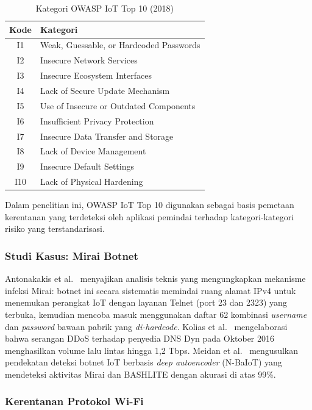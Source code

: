 \documentclass[conference]{IEEEtran}
\begin{document}
\begin{table}[htbp]
\caption{Kategori OWASP IoT Top 10 (2018)}
\label{tab:owasp_list}
\renewcommand{\arraystretch}{1.2}
\begin{tabularx}{\columnwidth}{|c|X|}
\hline
\textbf{Kode} & \textbf{Kategori} \\
\hline
I1 & Weak, Guessable, or Hardcoded Passwords \\
\hline
I2 & Insecure Network Services \\
\hline
I3 & Insecure Ecosystem Interfaces \\
\hline
I4 & Lack of Secure Update Mechanism \\
\hline
I5 & Use of Insecure or Outdated Components \\
\hline
I6 & Insufficient Privacy Protection \\
\hline
I7 & Insecure Data Transfer and Storage \\
\hline
I8 & Lack of Device Management \\
\hline
I9 & Insecure Default Settings \\
\hline
I10 & Lack of Physical Hardening \\
\hline
\end{tabularx}
\end{table}

Dalam penelitian ini, OWASP IoT Top 10 digunakan sebagai basis pemetaan kerentanan yang terdeteksi oleh aplikasi pemindai terhadap kategori-kategori risiko yang terstandarisasi.

\subsubsection{Studi Kasus: Mirai Botnet}

Antonakakis et al.\ \cite{antonakakis2017} menyajikan analisis teknis yang mengungkapkan mekanisme infeksi Mirai: botnet ini secara sistematis memindai ruang alamat IPv4 untuk menemukan perangkat IoT dengan layanan Telnet (port 23 dan 2323) yang terbuka, kemudian mencoba masuk menggunakan daftar 62 kombinasi \textit{username} dan \textit{password} bawaan pabrik yang \textit{di-hardcode}. Kolias et al.\ \cite{kolias2017} mengelaborasi bahwa serangan DDoS terhadap penyedia DNS Dyn pada Oktober 2016 menghasilkan volume lalu lintas hingga 1,2 Tbps. Meidan et al.\ \cite{meidan2018} mengusulkan pendekatan deteksi botnet IoT berbasis \textit{deep autoencoder} (N-BaIoT) yang mendeteksi aktivitas Mirai dan BASHLITE dengan akurasi di atas 99\%.

\subsubsection{Kerentanan Protokol Wi-Fi}
\end{document}
